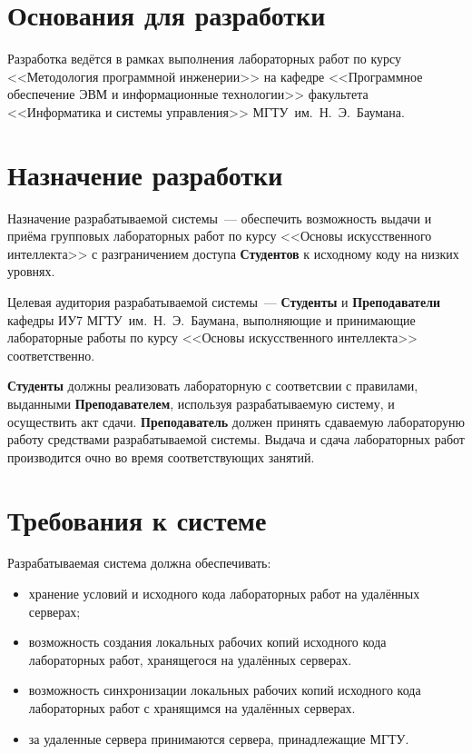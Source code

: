 \documentclass{bmstu}
\begin{document}
  \section{Основания для разработки}

  Разработка ведётся в рамках выполнения лабораторных работ по курсу
  <<Методология программной инженерии>> на кафедре <<Программное
  обеспечение ЭВМ и информационные технологии>> факультета
  <<Информатика и системы управления>> МГТУ~им.~Н.~Э.~Баумана.

  \section{Назначение разработки}

  Назначение разрабатываемой системы~--- обеспечить возможность выдачи и приёма
  групповых лабораторных работ по курсу <<Основы искусственного интеллекта>> с
  разграничением доступа \textbf{Студентов} к исходному коду на низких уровнях.

  Целевая аудитория разрабатываемой системы~--- \textbf{Студенты} и
  \textbf{Преподаватели} кафедры ИУ7 МГТУ~им.~Н.~Э.~Баумана, выполняющие и
  принимающие лабораторные работы по курсу <<Основы искусственного интеллекта>>
  соответственно.

  \textbf{Студенты} должны реализовать лабораторную с соответсвии с правилами,
  выданными \textbf{Преподавателем}, используя разрабатываемую систему, и
  осуществить акт сдачи.
  \textbf{Преподаватель} должен принять сдаваемую лабораторуню работу
  средствами разрабатываемой системы.
  Выдача и сдача лабораторных работ производится очно во время соответствующих занятий.

  \section{Требования к системе}

  Разрабатываемая система должна обеспечивать:
  \begin{itemize}[label=---]
    \item хранение условий и исходного кода лабораторных работ на
      удалённых серверах;
    \item возможность создания локальных рабочих копий исходного кода
      лабораторных работ, хранящегося на удалённых серверах.
    \item возможность синхронизации локальных рабочих копий исходного
      кода лабораторных работ с хранящимся на удалённых серверах.
    \item за удаленные сервера принимаются сервера, принадлежащие МГТУ. 
  \end{itemize}
\end{document}

